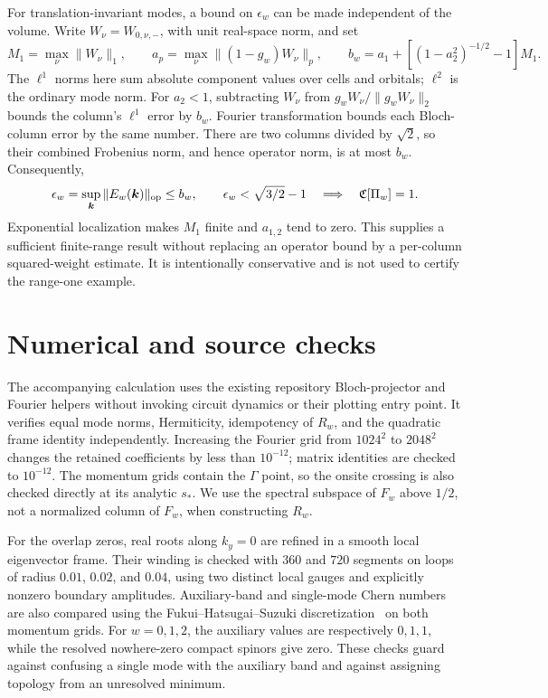 \documentclass[aps,prb,onecolumn,nofootinbib,superscriptaddress]{revtex4-2}
\newcommand{\Ch}{\mathfrak C}
\newcommand{\bk}{\boldsymbol k}
\begin{document}
For translation-invariant modes, a bound on $\epsilon_w$ can be made
independent of the volume. Write $W_\nu=W_{0,\nu,-}$, with unit real-space
norm, and set
\begin{equation}
 M_1=\max_\nu\|W_\nu\|_1,\qquad
 a_p=\max_\nu\|(1-g_w)W_\nu\|_p,\qquad
 b_w=a_1+\left[(1-a_2^2)^{-1/2}-1\right]M_1.
 \label{eq:tail-norms}
\end{equation}
The $\ell^1$ norms here sum absolute component values over cells and
orbitals; $\ell^2$ is the ordinary mode norm. For $a_2<1$, subtracting
$W_\nu$ from $g_wW_\nu/\|g_wW_\nu\|_2$ bounds the column's $\ell^1$
error by $b_w$. Fourier transformation bounds each Bloch-column error
by the same number. There are two columns divided by $\sqrt2$, so their
combined Frobenius norm, and hence operator norm, is at most $b_w$.
Consequently,
\begin{equation}
 \epsilon_w=\sup_{\bk}\|E_w(\bk)\|_{\rm op}\le b_w,
 \qquad \epsilon_w<\sqrt{3/2}-1
 \quad\Longrightarrow\quad\Ch[\Pi_w]=1.
 \label{eq:synthesis-result}
\end{equation}
Exponential localization makes $M_1$ finite and $a_{1,2}$ tend to zero.
This supplies a sufficient finite-range result without replacing an operator
bound by a per-column squared-weight estimate. It is intentionally
conservative and is not used to certify the range-one example.

\section{Numerical and source checks}
\label{app:checks}

The accompanying calculation uses the existing repository Bloch-projector
and Fourier helpers without invoking circuit dynamics or their plotting
entry point. It verifies equal mode norms, Hermiticity, idempotency of
$R_w$, and the quadratic frame identity independently. Increasing the
Fourier grid from $1024^2$ to $2048^2$ changes the retained coefficients
by less than $10^{-12}$; matrix identities are checked to $10^{-12}$.
The momentum grids contain the $\Gamma$ point, so the onsite crossing
is also checked directly at its analytic $s_*$. We use the spectral
subspace of $F_w$ above $1/2$, not a normalized column of
$F_w$, when constructing $R_w$.

For the overlap zeros, real roots along $k_y=0$ are refined in a smooth
local eigenvector frame. Their winding is checked with $360$ and $720$
segments on loops of radius $0.01$, $0.02$, and $0.04$, using two distinct
local gauges and explicitly nonzero boundary amplitudes. Auxiliary-band
and single-mode Chern numbers are also compared using the
Fukui--Hatsugai--Suzuki discretization~\cite{Fukui2005} on both momentum
grids. For $w=0,1,2$, the auxiliary values are respectively $0,1,1$,
while the resolved nowhere-zero compact spinors give zero. These checks
guard against confusing a single mode with the auxiliary band and against
assigning topology from an unresolved minimum.
\end{document}

